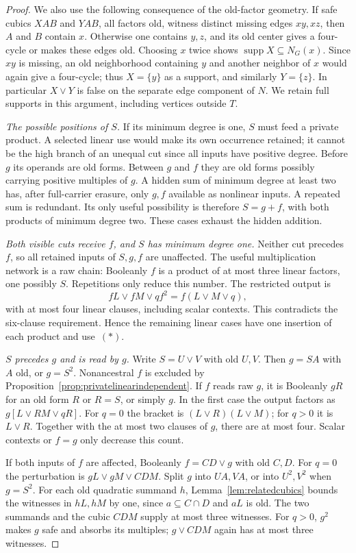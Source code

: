 \documentclass[11pt]{article}
\newcommand{\supp}{\operatorname{supp}}
\theoremstyle{definition}
\theoremstyle{remark}
\begin{document}
\begin{proof}
We also use the following consequence of the old-factor geometry. If safe cubics $XAB$ and $YAB$, all factors old, witness distinct missing edges $xy,xz$, then $A$ and $B$ contain $x$. Otherwise one contains $y,z$, and its old center gives a four-cycle or makes these edges old. Choosing $x$ twice shows $\supp X\subseteq N_G(x)$. Since $xy$ is missing, an old neighborhood containing $y$ and another neighbor of $x$ would again give a four-cycle; thus $X=\{y\}$ as a support, and similarly $Y=\{z\}$. In particular $X\vee Y$ is false on the separate edge component of $N$. We retain full supports in this argument, including vertices outside $T$.

\emph{The possible positions of $S$.} If its minimum degree is one, $S$ must feed a private product. A selected linear use would make its own occurrence retained; it cannot be the high branch of an unequal cut since all inputs have positive degree. Before $g$ its operands are old forms. Between $g$ and $f$ they are old forms possibly carrying positive multiples of $g$. A hidden sum of minimum degree at least two has, after full-carrier erasure, only $g,f$ available as nonlinear inputs. A repeated sum is redundant. Its only useful possibility is therefore $S=g+f$, with both products of minimum degree two. These cases exhaust the hidden addition.

\emph{Both visible cuts receive $f$, and $S$ has minimum degree one.} Neither cut precedes $f$, so all retained inputs of $S,g,f$ are unaffected. The useful multiplication network is a raw chain: Booleanly $f$ is a product of at most three linear factors, one possibly $S$. Repetitions only reduce this number. The restricted output is
\[
 fL\vee fM\vee qf^2=f(L\vee M\vee q),
\]
with at most four linear clauses, including scalar contexts. This contradicts the six-clause requirement. Hence the remaining linear cases have one insertion of each product and use~$(*)$.

\emph{$S$ precedes $g$ and is read by $g$.} Write $S=U\vee V$ with old $U,V$. Then $g=SA$ with $A$ old, or $g=S^2$. Nonancestral $f$ is excluded by Proposition~\ref{prop:privatelinearindependent}. If $f$ reads raw $g$, it is Booleanly $gR$ for an old form $R$ or $R=S$, or simply $g$. In the first case the output factors as $g[L\vee RM\vee qR]$. For $q=0$ the bracket is $(L\vee R)(L\vee M)$; for $q>0$ it is $L\vee R$. Together with the at most two clauses of $g$, there are at most four. Scalar contexts or $f=g$ only decrease this count.

If both inputs of $f$ are affected, Booleanly $f=CD\vee g$ with old $C,D$. For $q=0$ the perturbation is $gL\vee gM\vee CDM$. Split $g$ into $UA,VA$, or into $U^2,V^2$ when $g=S^2$. For each old quadratic summand $h$, Lemma~\ref{lem:relatedcubics} bounds the witnesses in $hL,hM$ by one, since $a\subseteq C\cap D$ and $aL$ is old. The two summands and the cubic $CDM$ supply at most three witnesses. For $q>0$, $g^2$ makes $g$ safe and absorbs its multiples; $g\vee CDM$ again has at most three witnesses.


\end{proof}
\end{document}
